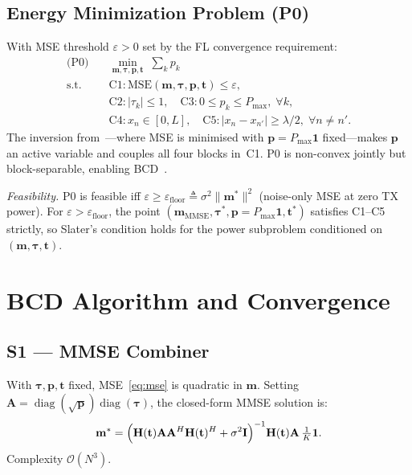 \documentclass[journal,letterpaper,10pt,twocolumn]{IEEEtran}
\begin{document}
\subsection{Energy Minimization Problem (P0)}

With MSE threshold $\varepsilon\!>\!0$ set by the FL convergence
requirement:
\begin{align}
  \text{(P0)}\quad &\min_{\mathbf{m},\boldsymbol{\tau},\mathbf{p},\mathbf{t}}
  \;\sum_{k} p_{k} \label{eq:P0obj}\\
  \text{s.t.}\quad
  &\text{C1}: \text{MSE}(\mathbf{m},\boldsymbol{\tau},\mathbf{p},\mathbf{t})\leq\varepsilon,
  \label{eq:C1}\\
  &\text{C2}: |\tau_{k}|\leq 1,\quad
   \text{C3}: 0\leq p_{k}\leq P_{\max},\;\forall k, \label{eq:C23}\\
  &\text{C4}: x_{n}\!\in\![0,L],\quad
   \text{C5}: |x_{n}-x_{n'}|\geq\lambda/2,\;\forall n\!\neq\!n'.
  \label{eq:C45}
\end{align}
The inversion from~\cite{Zhang2024}---where MSE is minimised with
$\mathbf{p}\!=\!P_{\max}\mathbf{1}$ fixed---makes $\mathbf{p}$ an
active variable and couples all four blocks in~C1. P0 is non-convex
jointly but block-separable, enabling BCD~\cite{Tseng2001}.

\textit{Feasibility.} P0 is feasible iff
$\varepsilon\geq\varepsilon_{\text{floor}}\!\triangleq\!\sigma^{2}\|\mathbf{m}^{*}\|^{2}$
(noise-only MSE at zero TX power). For
$\varepsilon\!>\!\varepsilon_{\text{floor}}$, the point
$(\mathbf{m}_{\text{MMSE}},\boldsymbol{\tau}^{*},\mathbf{p}\!=\!P_{\max}\mathbf{1},\mathbf{t}^{*})$
satisfies C1--C5 strictly, so Slater's condition holds for the power
subproblem conditioned on $(\mathbf{m},\boldsymbol{\tau},\mathbf{t})$.

\section{BCD Algorithm and Convergence}

\subsection{S1 --- MMSE Combiner}

With $\boldsymbol{\tau},\mathbf{p},\mathbf{t}$ fixed, MSE~\eqref{eq:mse}
is quadratic in $\mathbf{m}$. Setting
$\mathbf{A}\!=\!\operatorname{diag}(\sqrt{\mathbf{p}})\operatorname{diag}(\boldsymbol{\tau})$,
the closed-form MMSE solution is:
\begin{equation}
  \mathbf{m}^{*} = \Bigl(\mathbf{H}(\mathbf{t})\mathbf{A}\mathbf{A}^{H}
  \mathbf{H}(\mathbf{t})^{H}+\sigma^{2}\mathbf{I}\Bigr)^{-1}
  \mathbf{H}(\mathbf{t})\mathbf{A}\,\tfrac{1}{K}\mathbf{1}.
  \label{eq:mmse}
\end{equation}
Complexity $\mathcal{O}(N^{3})$.
\end{document}
